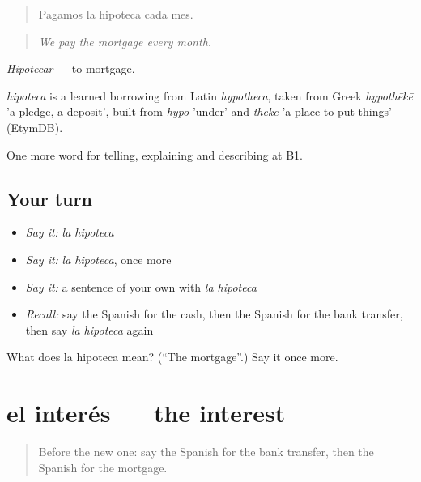 \begin{quote}
Pagamos la hipoteca cada mes.
\end{quote}

\begin{quote}
\emph{We pay the mortgage every month.}
\end{quote}

\emph{Hipotecar} — to mortgage.

\begin{cousinweb}
\emph{hipoteca} is a learned borrowing from Latin \emph{hypotheca}, taken from Greek \emph{hypothēkē} 'a pledge, a deposit', built from \emph{hypo} 'under' and \emph{thēkē} 'a place to put things' (EtymDB).
\end{cousinweb}

\begin{grammarlens}[title={What you've built}]
One more word for telling, explaining and describing at B1.
\end{grammarlens}

\subsection*{Your turn}
\begin{itemize}
\raggedright
  \item \emph{Say it:} \emph{la hipoteca}
  \item \emph{Say it:} \emph{la hipoteca}, once more
  \item \emph{Say it:} a sentence of your own with \emph{la hipoteca}
  \item \emph{Recall:} say the Spanish for the cash, then the Spanish for the bank transfer, then say \emph{la hipoteca} again
\end{itemize}

\begin{tcolorbox}[breakable,colback=teal!4,colframe=teal!35!black,title={Before you move on}]
What does la hipoteca mean? (\textquotedblleft{}The mortgage\textquotedblright{}.) Say it once more.
\end{tcolorbox}
\section[el interés]{el interés — the interest}

\label{lesson:ES-C628-interes}



\begin{quote}
Before the new one: say the Spanish for the bank transfer, then the Spanish for the mortgage.
\end{quote}

